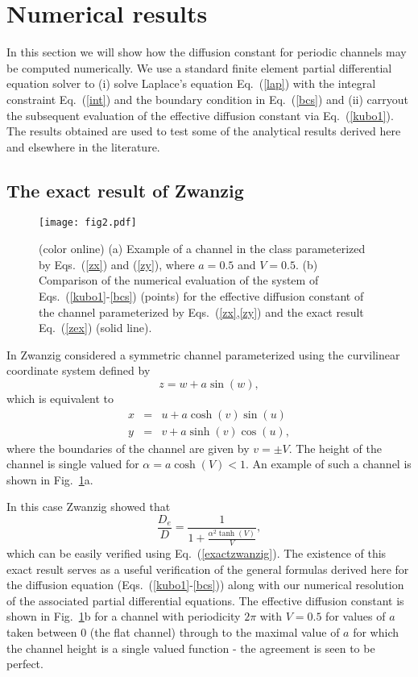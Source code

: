 \documentclass[pre,showpacs,preprintnumbers,amsmath,amssymb,superscriptaddress]{revtex4-1}
\begin{document}
{{\section{Numerical results}
\label{Sec7}
In this section we will show how the diffusion constant for periodic channels may be computed numerically. We use a standard finite element partial differential equation solver to (i) solve Laplace's equation Eq.~(\ref{lap}) with the integral constraint Eq.~(\ref{int}) and the boundary condition in Eq.~(\ref{bcs}) and (ii) carryout the subsequent evaluation of the effective diffusion constant via Eq.~(\ref{kubo1}). The results obtained are used to test some of the analytical results derived here and  elsewhere in the literature.

\subsection{The exact result of Zwanzig}

\begin{figure}
\begin{center}
  \texttt{[image: fig2.pdf]}
  \caption{(color online) (a) Example of a channel in the class parameterized by Eqs.~(\ref{zx}) and (\ref{zy}), where $a= 0.5$ and $V=0.5$. (b) Comparison of the numerical evaluation of the system of Eqs.~(\ref{kubo1}-\ref{bcs}) (points) for the effective diffusion constant of the channel parameterized by Eqs.~(\ref{zx},\ref{zy}) and the exact result Eq.~(\ref{zex}) (solid line).
  }\label{zwanzigfig}
\end{center}
\end{figure}

In \cite{zwa1982} Zwanzig considered a symmetric channel parameterized using the curvilinear coordinate system defined by 
\begin{equation}
z=w+a \sin(w),
\end{equation}
which is equivalent to
\begin{eqnarray}
x&=& u + a \cosh(v)\sin(u) \label{zx} \\
y &=& v+ a \sinh(v)\cos(u),\label{zy}
\end{eqnarray} 
where the boundaries of the channel are given by $v=\pm V$. The height of the channel is single valued for $\alpha =a\cosh(V) <1$. An example of such a channel is shown in Fig.~\ref{zwanzigfig}a.

In this case Zwanzig showed that
\begin{equation}
\frac{D_e}{D} = \frac{1}{1 + \frac{\alpha^2\tanh(V)}{V}},\label{zex}
\end{equation}
which can be easily verified using Eq.~(\ref{exactzwanzig}). The existence of this exact result serves as a useful verification of the general formulas derived here for the diffusion equation (Eqs.~(\ref{kubo1}-\ref{bcs})) along with our numerical resolution of the associated partial differential equations. The effective diffusion constant is shown in Fig.~\ref{zwanzigfig}b for a channel with periodicity $2\pi$ with $V=0.5$ for 
values of $a$ taken between $0$ (the flat channel) through to the maximal value of $a$ for which the channel height is
a single valued function - the agreement is seen to be perfect. 

}}
\end{document}
